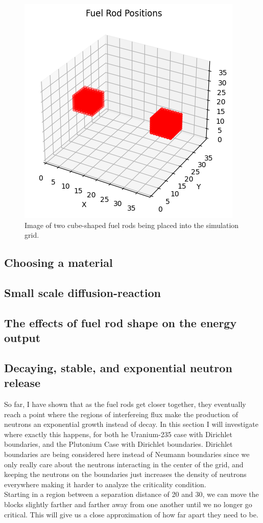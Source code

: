 \documentclass[letterpaper, 12pt]{article}
\begin{document}
      \begin{figure}[h!]
         \centering
         \includegraphics[width=0.4\linewidth]{Graphs/Graph_FuelRodsInGrid.png}
         \caption{Image of two cube-shaped fuel rods being placed into the simulation grid.}
      \end{figure}

      \subsection{Choosing a material}
      \subsection{Small scale diffusion-reaction}
      \subsection{The effects of fuel rod shape on the energy output}
      \subsection{Decaying, stable, and exponential neutron release}
         So far, I have shown that as the fuel rods get closer together, they eventually reach a point where the regions of interfereing flux make the production of neutrons an exponential growth instead of decay. In this section I will investigate where exactly this happens, for both he Uranium-235 case with Dirichlet boundaries, and the Plutonium Case with Dirichlet boundaries. Dirichlet boundaries are being considered here instead of Neumann boundaries since we only really care about the neutrons interacting in the center of the grid, and keeping the neutrons on the boundaries just increases the density of neutrons everywhere making it harder to analyze the criticality condition.\\

         Starting in a region between a separation distance of 20 and 30, we can move the blocks slightly farther and farther away from one another until we no longer go critical. This will give us a close approximation of how far apart they need to be.
\end{document}
